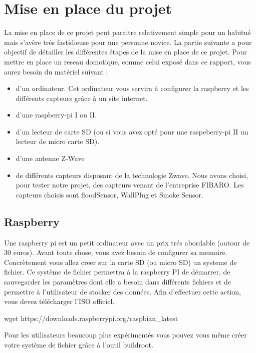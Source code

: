 \chapter{Mise en place du projet}
La mise en place de ce projet peut paraitre relativement simple pour un habitué mais s'avère trés fastidieuse pour une personne novice.
La partie suivante a pour objectif de détailler les différentes étapes de la mise en place de ce projet.
Pour mettre en place un reseau domotique, comme celui exposé dans ce rapport, vous aurez besoin du matériel suivant :

\begin{itemize}
	\item d'un  ordinateur. Cet ordinateur vous servira à configurer la raspberry et les différents capteurs grâce à un site internet.
	\item d'une raspberry-pi I ou II. 
	\item d'un lecteur de carte SD (ou si vous avez opté pour une raspeberry-pi II un lecteur de micro carte SD).
	\item d'une antenne Z-Wave
	\item de différents capteurs disposant de la technologie Zwave. Nous avons choisi, pour tester notre projet, des capteurs venant de l'entreprise FIBARO. Les capteurs choisis sont floodSensor, WallPlug et Smoke Sensor.
\end{itemize}

\section{Raspberry}
Une raspberry pi est un petit ordinateur avec un prix trés abordable (autour de 30 euros).
Avant toute chose, vous avez besoin de configurer sa memoire. Concrètement vous allez creer sur la carte SD (ou micro SD) un systeme de fichier.
Ce système de fichier permettra à la raspberry PI de démarrer, de sauvegarder les paramètres dont elle a besoin dans différents fichiers et de permettre à l'utilisateur de stocker des données.
Afin d'effectuer cette action, vous devez télécharger l'ISO officiel. 


\begin{terminal}
wget https://downloads.raspberrypi.org/raspbian\_latest
\end{terminal}

Pour les utilisateurs beaucoup plus expérimentés vous pouvez vous même créer votre système de fichier grâce à l'outil buildroot.

